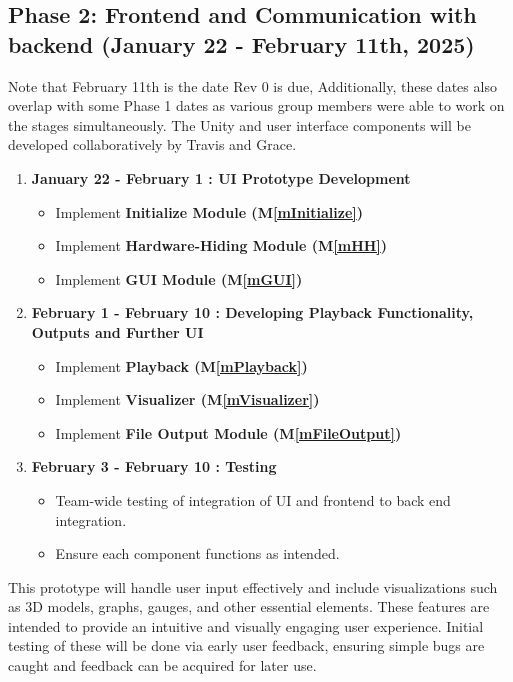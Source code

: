 \documentclass[12pt, titlepage]{article}
\begin{document}
\subsection*{Phase 2: Frontend and Communication with backend (January 22 - February 11th, 2025)}
Note that February 11th is the date Rev 0 is due, Additionally, these dates also overlap with some Phase 1 dates as various group members were able to work on the stages simultaneously. 
The Unity and user interface components will be developed collaboratively by Travis and Grace. 
\begin{enumerate}
    \item \textbf{January 22 - February 1 : UI Prototype Development}
    \begin{itemize}
        \item Implement \textbf{Initialize Module (M\ref{mInitialize})}
        \item Implement \textbf{Hardware-Hiding Module (M\ref{mHH})}
        \item Implement \textbf{GUI Module (M\ref{mGUI})}
    \end{itemize}
    
    \item \textbf{February 1 - February 10 : Developing Playback Functionality, Outputs and Further UI}
    \begin{itemize}
        \item Implement \textbf{Playback (M\ref{mPlayback})}
        \item Implement \textbf{Visualizer (M\ref{mVisualizer})}
        \item Implement \textbf{File Output Module (M\ref{mFileOutput})}
    \end{itemize}

    \item \textbf{February 3 - February 10 : Testing}
    \begin{itemize}
      \item Team-wide testing of integration of UI and frontend to back end integration.
      \item Ensure each component functions as intended.
  \end{itemize}
  \end{enumerate}

This prototype will handle user input effectively and include visualizations such as 3D models, graphs, gauges, and other essential elements. 
These features are intended to provide an intuitive and visually engaging user experience. 
Initial testing of these will be done via early user feedback, ensuring simple bugs are caught and feedback can be acquired for later use. 
\end{document}
